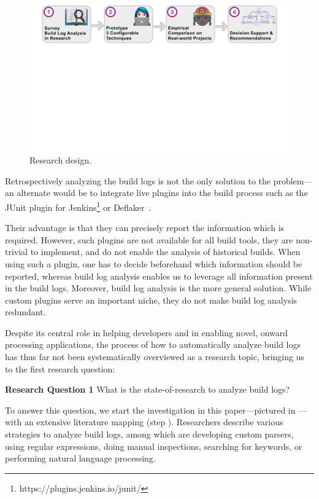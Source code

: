\begin{figure}[htb]
	\centering
	\includegraphics[width=\textwidth, trim={1.2cm 10.5cm 1.2cm 0cm},
	clip]{img/overview.pdf}
	\caption{Research design.}
	\label{fig:overview}
\end{figure}

Retrospectively analyzing the build logs is not the only solution to
the problem---an alternate would be to integrate live plugins into the
build process such as the JUnit
plugin for Jenkins\footnote{https://plugins.jenkins.io/junit/} or
Deflaker~\citep{bell2018deflaker}.

Their advantage is that they can precisely report the information which
is required.
However, such plugins are not available for all build tools, they are
non-trivial to implement, and
do not enable the analysis of historical builds.
When using such a plugin, one has to decide
beforehand which information should be reported, whereas
build log analysis enables us to leverage all information
present in the build logs.
Moreover, build log analysis is the more general solution.
While custom plugins serve an important niche, they do not make build
log analysis redundant.

Despite its central role in helping developers and in enabling
novel, onward processing applications,
the process of how to
automatically
analyze build logs has thus far not been systematically
overviewed as a research topic, bringing us to the first
research question:
\begin{simplebox}[minipage boxed title*=-5cm]{\textbf{Research Question
1}}
What is the state-of-research to analyze build logs?
\end{simplebox}

To answer this question, we start the investigation in this
paper---pictured in
---with an
extensive literature mapping (step ).
Researchers describe various strategies to
analyze build logs, among which are developing
custom parsers, using regular expressions, doing manual inspections,
searching for keywords, or performing natural language processing.

